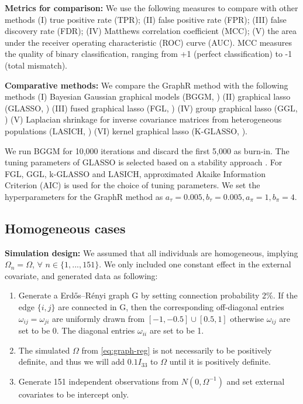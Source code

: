 \documentclass[
]{book}
\begin{document}
\textbf{Metrics for comparison:} We use the following measures to compare with other methods (I) true positive rate (TPR); (II) false positive rate (FPR); (III) false discovery rate (FDR); (IV) Matthews correlation coefficient (MCC); (V) the area under the receiver operating characteristic (ROC) curve (AUC). MCC \citep{matthews1975comparison} measures the quality of binary classification, ranging from +1 (perfect classification) to -1 (total mismatch).

\textbf{Comparative methods:} We compare the GraphR method with the following methods (I) Bayesian Gaussian graphical models (BGGM, \citet{mohammadi2015bayesian}) (II) graphical lasso (GLASSO, \citet{friedman2008sparse}) (III) fused graphical lasso (FGL, \citet{danaher2014joint}) (IV) group graphical lasso (GGL, \citet{danaher2014joint}) (V) Laplacian shrinkage for inverse covariance matrices from heterogeneous populations (LASICH, \citet{saegusa2016joint}) (VI) kernel graphical lasso (K-GLASSO, \citet{liu2010graph}).

We run BGGM for 10,000 iterations and discard the first 5,000 as burn-in. The tuning parameters of GLASSO is selected based on a stability approach \cite{liu2010stability}. For FGL, GGL, k-GLASSO and LASICH, approximated Akaike Information Criterion (AIC) is used for the choice of tuning parameters. We set the hyperparameters for the GraphR method as \(a_\tau = 0.005, b_\tau = 0.005, a_\pi = 1, b_\pi =4\).

\hypertarget{simhomo}{%
\subsection{Homogeneous cases}\label{simhomo}}

\textbf{Simulation design:}
We assumed that all individuals are homogeneous, implying \(\Omega_n = \Omega\), \(\forall\) \(n \in \{1,...,151\}\). We only included one constant effect in the external covariate, and generated data as following:

\begin{enumerate}
\def\labelenumi{(\Roman{enumi})}
\item
  Generate a Erdős--Rényi graph G by setting connection probability 2\%. If the edge \(\{i,j\}\) are connected in G, then the corresponding off-diagonal entries \(\omega_{ij} = \omega_{ji}\) are uniformly drawn from \([-1,-0.5] \cup [0.5,1]\) otherwise \(\omega_{ij}\) are set to be 0. The diagonal entries \(\omega_{ii}\) are set to be 1.
\item
  The simulated \(\Omega\) from \eqref{eq:graph-reg} is not necessarily to be positively definite, and thus we will add \(0.1I_{33}\) to \(\Omega\) until it is positively definite.
\item
  Generate 151 independent observations from \(N(0, \Omega^{-1})\) and set external covariates to be intercept only.
\end{enumerate}
\end{document}

